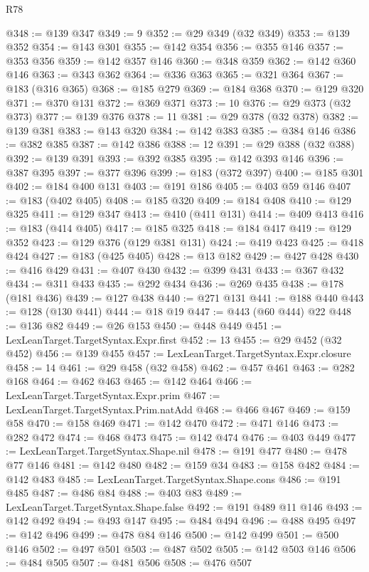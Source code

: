 \begin{lexlean}{R78}
\begin{coremodule}
@348 := @139 @347
@349 := 9
@352 := @29 @349 (@32 @349)
@353 := @139 @352
@354 := @143 @301
@355 := @142 @354
@356 := @355 @146
@357 := @353 @356
@359 := @142 @357 @146
@360 := @348 @359
@362 := @142 @360 @146
@363 := @343 @362
@364 := @336 @363
@365 := @321 @364
@367 := @183 (@316 @365)
@368 := @185 @279
@369 := @184 @368
@370 := @129 @320
@371 := @370 @131
@372 := @369 @371
@373 := 10
@376 := @29 @373 (@32 @373)
@377 := @139 @376
@378 := 11
@381 := @29 @378 (@32 @378)
@382 := @139 @381
@383 := @143 @320
@384 := @142 @383
@385 := @384 @146
@386 := @382 @385
@387 := @142 @386
@388 := 12
@391 := @29 @388 (@32 @388)
@392 := @139 @391
@393 := @392 @385
@395 := @142 @393 @146
@396 := @387 @395
@397 := @377 @396
@399 := @183 (@372 @397)
@400 := @185 @301
@402 := @184 @400 @131
@403 := @191 @186
@405 := @403 @59 @146
@407 := @183 (@402 @405)
@408 := @185 @320
@409 := @184 @408
@410 := @129 @325
@411 := @129 @347
@413 := @410 (@411 @131)
@414 := @409 @413
@416 := @183 (@414 @405)
@417 := @185 @325
@418 := @184 @417
@419 := @129 @352
@423 := @129 @376 (@129 @381 @131)
@424 := @419 @423
@425 := @418 @424
@427 := @183 (@425 @405)
@428 := @13 @182
@429 := @427 @428
@430 := @416 @429
@431 := @407 @430
@432 := @399 @431
@433 := @367 @432
@434 := @311 @433
@435 := @292 @434
@436 := @269 @435
@438 := @178 (@181 @436)
@439 := @127 @438
@440 := @271 @131
@441 := @188 @440
@443 := @128 (@130 @441)
@444 := @18 @19
@447 := @443 (@60 @444) @22
@448 := @136 @82
@449 := @26 @153
@450 := @448 @449
@451 := LexLeanTarget.TargetSyntax.Expr.first
@452 := 13
@455 := @29 @452 (@32 @452)
@456 := @139 @455
@457 := LexLeanTarget.TargetSyntax.Expr.closure
@458 := 14
@461 := @29 @458 (@32 @458)
@462 := @457 @461
@463 := @282 @168
@464 := @462 @463
@465 := @142 @464
@466 := LexLeanTarget.TargetSyntax.Expr.prim
@467 := LexLeanTarget.TargetSyntax.Prim.natAdd
@468 := @466 @467
@469 := @159 @58
@470 := @158 @469
@471 := @142 @470
@472 := @471 @146
@473 := @282 @472
@474 := @468 @473
@475 := @142 @474
@476 := @403 @449
@477 := LexLeanTarget.TargetSyntax.Shape.nil
@478 := @191 @477
@480 := @478 @77 @146
@481 := @142 @480
@482 := @159 @34
@483 := @158 @482
@484 := @142 @483
@485 := LexLeanTarget.TargetSyntax.Shape.cons
@486 := @191 @485
@487 := @486 @84
@488 := @403 @83
@489 := LexLeanTarget.TargetSyntax.Shape.false
@492 := @191 @489 @11 @146
@493 := @142 @492
@494 := @493 @147
@495 := @484 @494
@496 := @488 @495
@497 := @142 @496
@499 := @478 @84 @146
@500 := @142 @499
@501 := @500 @146
@502 := @497 @501
@503 := @487 @502
@505 := @142 @503 @146
@506 := @484 @505
@507 := @481 @506
@508 := @476 @507

\end{coremodule}
\end{lexlean}

